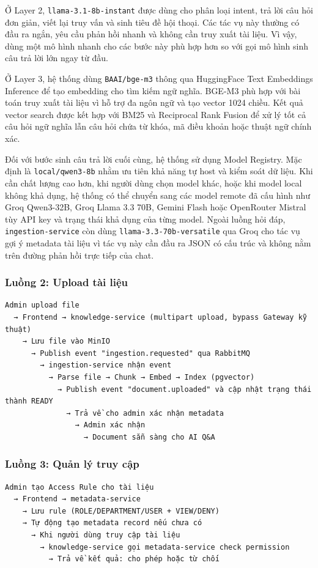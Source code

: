 \documentclass[12pt,a4paper]{report}
\begin{document}
Ở Layer 2, \texttt{llama-3.1-8b-instant} được dùng cho phân loại intent, trả lời câu hỏi đơn giản, viết lại truy vấn và sinh tiêu đề hội thoại. Các tác vụ này thường có đầu ra ngắn, yêu cầu phản hồi nhanh và không cần truy xuất tài liệu. Vì vậy, dùng một mô hình nhanh cho các bước này phù hợp hơn so với gọi mô hình sinh câu trả lời lớn ngay từ đầu.

Ở Layer 3, hệ thống dùng \texttt{BAAI/bge-m3} thông qua HuggingFace Text Embeddings Inference để tạo embedding cho tìm kiếm ngữ nghĩa. BGE-M3 phù hợp với bài toán truy xuất tài liệu vì hỗ trợ đa ngôn ngữ và tạo vector 1024 chiều. Kết quả vector search được kết hợp với BM25 và Reciprocal Rank Fusion để xử lý tốt cả câu hỏi ngữ nghĩa lẫn câu hỏi chứa từ khóa, mã điều khoản hoặc thuật ngữ chính xác.

Đối với bước sinh câu trả lời cuối cùng, hệ thống sử dụng Model Registry. Mặc định là \texttt{local/qwen3-8b} nhằm ưu tiên khả năng tự host và kiểm soát dữ liệu. Khi cần chất lượng cao hơn, khi người dùng chọn model khác, hoặc khi model local không khả dụng, hệ thống có thể chuyển sang các model remote đã cấu hình như Groq Qwen3-32B, Groq Llama 3.3 70B, Gemini Flash hoặc OpenRouter Mistral tùy API key và trạng thái khả dụng của từng model. Ngoài luồng hỏi đáp, \texttt{ingestion-service} còn dùng \texttt{llama-3.3-70b-versatile} qua Groq cho tác vụ gợi ý metadata tài liệu vì tác vụ này cần đầu ra JSON có cấu trúc và không nằm trên đường phản hồi trực tiếp của chat.

\subsubsection{Luồng 2: Upload tài liệu}
\begin{verbatim}
Admin upload file
  → Frontend → knowledge-service (multipart upload, bypass Gateway kỹ thuật)
    → Lưu file vào MinIO
      → Publish event "ingestion.requested" qua RabbitMQ
        → ingestion-service nhận event
          → Parse file → Chunk → Embed → Index (pgvector)
            → Publish event "document.uploaded" và cập nhật trạng thái thành READY
              → Trả về cho admin xác nhận metadata
                → Admin xác nhận
                  → Document sẵn sàng cho AI Q&A
\end{verbatim}

\subsubsection{Luồng 3: Quản lý truy cập}
\begin{verbatim}
Admin tạo Access Rule cho tài liệu
  → Frontend → metadata-service
    → Lưu rule (ROLE/DEPARTMENT/USER + VIEW/DENY)
    → Tự động tạo metadata record nếu chưa có
      → Khi người dùng truy cập tài liệu
        → knowledge-service gọi metadata-service check permission
          → Trả về kết quả: cho phép hoặc từ chối
\end{verbatim}
\end{document}
